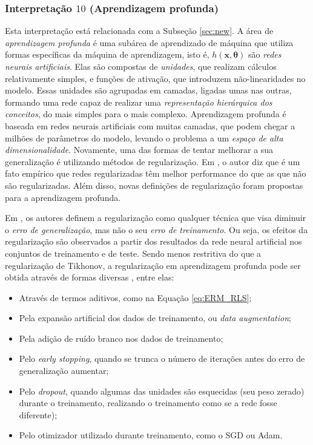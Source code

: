 \subsubsection{Interpretação $10$ (Aprendizagem profunda)}

Esta interpretação está relacionada com a Subseção \ref{sec:new}. A área de \textit{aprendizagem profunda} é uma subárea de aprendizado de máquina que utiliza formas específicas da máquina de aprendizagem, isto é, $h(\mathbf{x}, \bm{\theta})$ são \textit{redes neurais artificiais}. Elas são compostas de \textit{unidades}, que realizam cálculos relativamente simples, e funções de ativação, que introduzem não-linearidades no modelo. Essas unidades são agrupadas em camadas, ligadas umas nas outras, formando uma rede capaz de realizar uma \textit{representação hierárquica dos conceitos}, do mais simples para o mais complexo. Aprendizagem profunda é baseada em redes neurais artificiais com muitas camadas, que podem chegar a milhões de parâmetros do modelo, levando o problema a um \textit{espaço de alta dimensionalidade}. Novamente, uma das formas de tentar melhorar a sua generalização é utilizando métodos de regularização. Em \cite{nielsen2018}, o autor diz que é um fato empírico que redes regularizadas têm melhor performance do que as que não são regularizadas. Além disso, novas definições de regularização foram propostas para a aprendizagem profunda.

Em \cite{goodfellow2016deep}, os autores definem a regularização como qualquer técnica que visa diminuir o \textit{erro de generalização}, mas não o seu \textit{erro de treinamento}. Ou seja, os efeitos da regularização são observados a partir dos resultados da rede neural artificial nos conjuntos de treinamento e de teste. Sendo menos restritiva do que a regularização de Tikhonov, a regularização em aprendizagem profunda pode ser obtida através de formas diversas \cite{goodfellow2016deep, nielsen2018}, entre elas:
\begin{itemize}
\item Através de termos aditivos, como na Equação \eqref{eq:ERM_RLS}; 
\item Pela expansão artificial dos dados de treinamento, ou \textit{data augmentation}; 
\item Pela adição de ruído branco nos dados de treinamento; 
\item Pelo \textit{early stopping}, quando se trunca o número de iterações antes do erro de generalização aumentar; 
\item Pelo \textit{dropout}, quando algumas das unidades são esquecidas (seu peso zerado) durante o treinamento, realizando o treinamento como se a rede fosse diferente); 
\item Pelo otimizador utilizado durante treinamento, como o SGD ou Adam.
\end{itemize}

